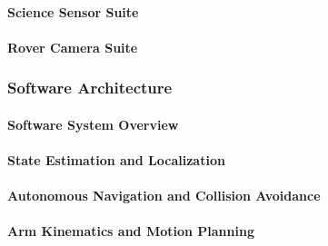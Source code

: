 \paragraph{Science Sensor Suite}
\label{par:science_sensor_suite}


\paragraph{Rover Camera Suite}
\label{par:rover_camera_suite}


\subsubsection{Software Architecture}
\label{subsubsec:software_architecture}

\paragraph{Software System Overview}
\label{par:software_system_overview}


\paragraph{State Estimation and Localization}
\label{par:state_estimation_localization}


\paragraph{Autonomous Navigation and Collision Avoidance}
\label{par:autonomous_navigation_collision_avoidance}


\paragraph{Arm Kinematics and Motion Planning}
\label{par:arm_kinematics_motion_planning}


